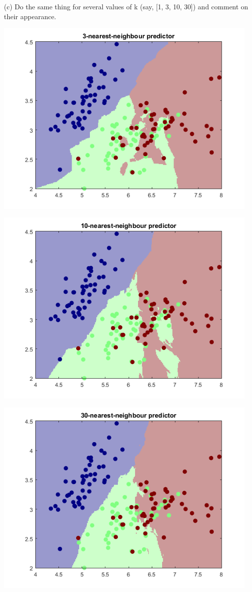 \documentclass[]{report}   %
\begin{document}
(c) Do the same thing for several values of k (say, [1, 3, 10, 30]) and comment on their appearance.
\begin{center}
	\includegraphics[width=35em]{2_4_Figure_3.png}
\end{center} 
\begin{center}
	\includegraphics[width=35em]{2_4_Figure_4.png}
\end{center} 
\begin{center}
	\includegraphics[width=35em]{2_4_Figure_5.png}
\end{center} 
\end{document}
